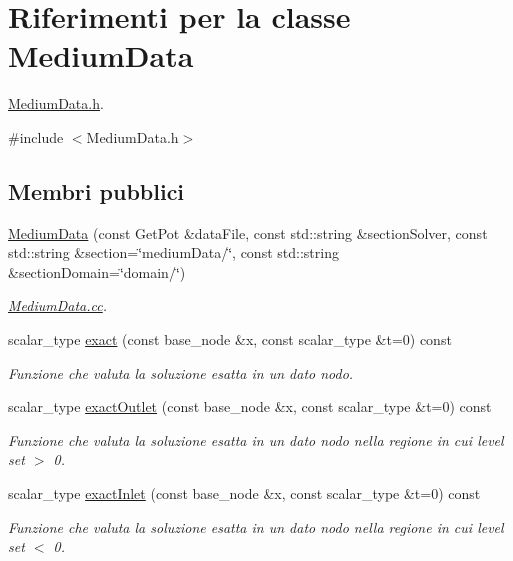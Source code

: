 \hypertarget{classMediumData}{\section{Riferimenti per la classe Medium\-Data}
\label{classMediumData}
}


\hyperlink{MediumData_8h}{Medium\-Data.\-h}.  




{\ttfamily \#include $<$Medium\-Data.\-h$>$}

\subsection*{Membri pubblici}
\begin{DoxyCompactItemize}
\item 
\hyperlink{classMediumData_aff5b247e34c08dbfa373e4cde5118da2}{Medium\-Data} (const Get\-Pot \&data\-File, const std\-::string \&section\-Solver, const std\-::string \&section=\char`\"{}medium\-Data/\char`\"{}, const std\-::string \&section\-Domain=\char`\"{}domain/\char`\"{})
\begin{DoxyCompactList}\small\item\em \hyperlink{MediumData_8cc}{Medium\-Data.\-cc}. \end{DoxyCompactList}\item 
scalar\-\_\-type \hyperlink{classMediumData_a41b88e8b0d9eb57c51e7aad518867ff1}{exact} (const base\-\_\-node \&x, const scalar\-\_\-type \&t=0) const 
\begin{DoxyCompactList}\small\item\em Funzione che valuta la soluzione esatta in un dato nodo. \end{DoxyCompactList}\item 
scalar\-\_\-type \hyperlink{classMediumData_adc228cb9d834aae8886ec520093a003a}{exact\-Outlet} (const base\-\_\-node \&x, const scalar\-\_\-type \&t=0) const 
\begin{DoxyCompactList}\small\item\em Funzione che valuta la soluzione esatta in un dato nodo nella regione in cui level set $>$ 0. \end{DoxyCompactList}\item 
scalar\-\_\-type \hyperlink{classMediumData_a9e2ebf4af56f981be28836750fd58a17}{exact\-Inlet} (const base\-\_\-node \&x, const scalar\-\_\-type \&t=0) const 
\begin{DoxyCompactList}\small\item\em Funzione che valuta la soluzione esatta in un dato nodo nella regione in cui level set $<$ 0. \end{DoxyCompactList}\item 

\end{DoxyCompactItemize}

